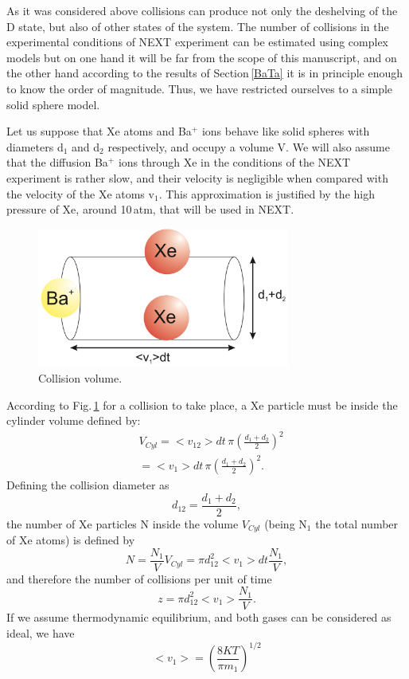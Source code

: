 As it was considered above collisions can produce not only the deshelving of the D state, but also of other states of the system. The number of collisions in the experimental conditions of NEXT experiment can be estimated using complex models but on one hand it will be far from the scope of this manuscript, and on the other hand according to the results of Section\,\ref{BaTa} it is in principle enough to know the order of magnitude. Thus, we have restricted ourselves to a simple solid sphere model.

Let us suppose that Xe atoms and Ba$^+$ ions behave like solid spheres with diameters d$_1$ and d$_2$ respectively, and occupy a volume V.  We will also assume that the diffusion Ba$^+$ ions through Xe in the conditions of the NEXT experiment is rather slow, and their velocity is negligible when compared with the velocity of the Xe atoms v$_1$. This approximation is justified by the high pressure of Xe, around 10\,atm, that will be used in NEXT.    

 \begin{figure}[ht!]
\begin{center}
\includegraphics[width=8.3cm, height=4.6cm]{imgs/CylColl.pdf}
\caption{\label{CylColl} Collision volume.}
\end{center}
\end{figure}

According to Fig.\,\ref{CylColl} for a collision to take place, a Xe particle must be inside the cylinder volume defined by:
\begin{align}
& V_{Cyl}=<v_{12}> dt \, \pi \left(\frac{d_1+d_2}{2}\right)^2 \\ \nonumber
& =<v_1> dt \, \pi \left(\frac{d_1+d_2}{2}\right)^2.
\end{align} 
Defining the collision diameter as 
\begin{equation}
d_{12}=\frac{d_1+d_2}{2},
\end{equation}
the number of Xe particles N inside the volume $V_{Cyl}$ (being N$_1$ the total number of Xe atoms) is defined by
\begin{equation}
N=\frac{N_1}{V}V_{Cyl}=\pi d_{12}^2 <v_{1}> dt \frac{N_1}{V},
\end{equation}
and therefore the number of collisions per unit of time
\begin{equation}
\label{collt}
z=\pi d_{12}^2 <v_{1}>\frac{N_1}{V}.
\end{equation}
If we assume thermodynamic equilibrium, and both gases can be considered as ideal, we have
\begin{equation}
<v_1>=\left(\frac{8KT}{\pi m_1}\right)^{1/2}
\end{equation}

